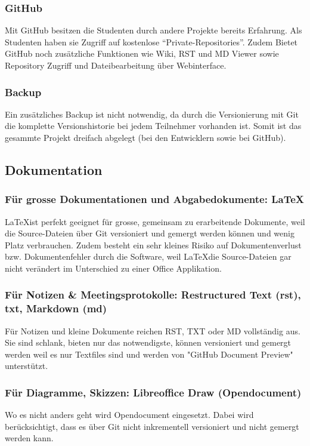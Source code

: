\subsubsection{GitHub}
Mit GitHub besitzen die Studenten durch andere Projekte bereits Erfahrung. Als Studenten haben sie Zugriff auf kostenlose ``Private-Repositories''. Zudem Bietet GitHub noch zusätzliche Funktionen wie Wiki, RST und MD Viewer sowie Repository Zugriff und Dateibearbeitung über Webinterface.

\subsubsection{Backup}
Ein zusätzliches Backup ist nicht notwendig, da durch die Versionierung mit Git die komplette Versionshistorie bei jedem Teilnehmer vorhanden ist. Somit ist das gesammte Projekt dreifach abgelegt (bei den Entwicklern sowie bei GitHub).


\subsection{Dokumentation}
\subsubsection{Für grosse Dokumentationen und Abgabedokumente: \LaTeX}
\LaTeX ist perfekt geeignet für grosse, gemeinsam zu erarbeitende Dokumente, weil die Source-Dateien über Git versioniert und gemergt werden können und wenig Platz verbrauchen. Zudem besteht ein sehr kleines Risiko auf Dokumentenverlust bzw. Dokumentenfehler durch die Software, weil \LaTeX die Source-Dateien gar nicht verändert im Unterschied zu einer Office Applikation.

\subsubsection{Für Notizen \& Meetingsprotokolle: Restructured Text (rst), txt, Markdown (md)}
Für Notizen und kleine Dokumente reichen RST, TXT oder MD vollständig aus. Sie sind schlank, bieten nur das notwendigste, können versioniert und gemergt werden weil es nur Textfiles sind und werden von "GitHub Document Preview" unterstützt.

\subsubsection{Für Diagramme, Skizzen: Libreoffice Draw (Opendocument)}
Wo es nicht anders geht wird Opendocument eingesetzt. Dabei wird berücksichtigt, dass es über Git nicht inkrementell versioniert und nicht gemergt werden kann.


